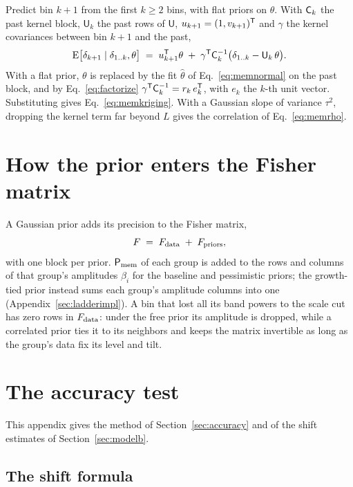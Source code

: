 Predict bin $k+1$ from the first $k \geq 2$ bins, with flat priors on
$\theta$.  With $\mathsf{C}_k$ the past kernel block, $\mathsf{U}_k$ the past
rows of $\mathsf{U}$, $u_{k+1} = (1, v_{k+1})^{\mathsf{T}}$ and $\gamma$ the
kernel covariances between bin $k+1$ and the past,
\begin{equation}
  \mathrm{E}\bigl[\delta_{k+1} \mid \delta_{1..k}, \theta\bigr]
  \;=\;
  u_{k+1}^{\mathsf{T}}\theta
  \;+\;
  \gamma^{\mathsf{T}} \mathsf{C}_k^{-1}
  \bigl(\delta_{1..k} - \mathsf{U}_k\,\theta\bigr).
  \label{eq:memcond}
\end{equation}
With a flat prior, $\theta$ is replaced by the fit $\hat{\theta}$ of
Eq.~\eqref{eq:memnormal} on the past block, and by
Eq.~\eqref{eq:factorize} $\gamma^{\mathsf{T}} \mathsf{C}_k^{-1} = r_k\, e_k^{\mathsf{T}}$, with $e_k$
the $k$-th unit vector.  Substituting gives Eq.~\eqref{eq:memkriging}.
With a Gaussian slope of variance $\tau^2$, dropping the kernel term
far beyond $L$ gives the correlation of Eq.~\eqref{eq:memrho}.

\section{How the prior enters the Fisher matrix}
\label{sec:fisher}

A Gaussian prior adds its precision to the Fisher matrix,
\begin{equation}
  F \;=\; F_{\rm data} \;+\; F_{\rm priors} ,
  \label{eq:fisher}
\end{equation}
with one block per prior.  $\mathsf{P}_{\rm mem}$ of each group is added to
the rows and columns of that group's amplitudes $\beta_i$ for the
baseline and pessimistic priors; the growth-tied prior instead sums
each group's amplitude columns into one (Appendix~\ref{sec:ladderimpl}).
A bin that lost all its band powers to the scale cut has zero rows in
$F_{\rm data}$: under the free prior its amplitude is dropped, while a
correlated prior ties it to its neighbors and keeps the matrix
invertible as long as the group's data fix its level and tilt.

\section{The accuracy test}
\label{app:bias}

This appendix gives the method of Section~\ref{sec:accuracy} and of
the shift estimates of Section~\ref{sec:modelb}.

\subsection{The shift formula}
\label{sec:biasformula}

